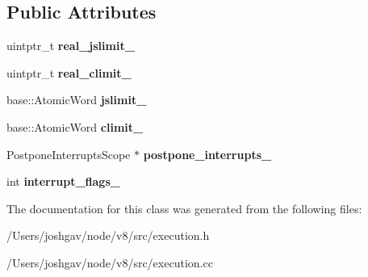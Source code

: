 \subsection*{Public Attributes}
\begin{DoxyCompactItemize}
\item 
uintptr\+\_\+t {\bfseries real\+\_\+jslimit\+\_\+}\hypertarget{classv8_1_1internal_1_1_stack_guard_1_1_thread_local_a06f2ec0bd13a31132859f4d1749179be}{}\label{classv8_1_1internal_1_1_stack_guard_1_1_thread_local_a06f2ec0bd13a31132859f4d1749179be}

\item 
uintptr\+\_\+t {\bfseries real\+\_\+climit\+\_\+}\hypertarget{classv8_1_1internal_1_1_stack_guard_1_1_thread_local_aebe6953c66e34e2f35f601954d504b97}{}\label{classv8_1_1internal_1_1_stack_guard_1_1_thread_local_aebe6953c66e34e2f35f601954d504b97}

\item 
base\+::\+Atomic\+Word {\bfseries jslimit\+\_\+}\hypertarget{classv8_1_1internal_1_1_stack_guard_1_1_thread_local_ad2eaff47c790e51551753aaaa73dd58d}{}\label{classv8_1_1internal_1_1_stack_guard_1_1_thread_local_ad2eaff47c790e51551753aaaa73dd58d}

\item 
base\+::\+Atomic\+Word {\bfseries climit\+\_\+}\hypertarget{classv8_1_1internal_1_1_stack_guard_1_1_thread_local_a3650cf32a9188751a7cd42c23de101d2}{}\label{classv8_1_1internal_1_1_stack_guard_1_1_thread_local_a3650cf32a9188751a7cd42c23de101d2}

\item 
Postpone\+Interrupts\+Scope $\ast$ {\bfseries postpone\+\_\+interrupts\+\_\+}\hypertarget{classv8_1_1internal_1_1_stack_guard_1_1_thread_local_a0c556d1816f10a572365c9e7181070d2}{}\label{classv8_1_1internal_1_1_stack_guard_1_1_thread_local_a0c556d1816f10a572365c9e7181070d2}

\item 
int {\bfseries interrupt\+\_\+flags\+\_\+}\hypertarget{classv8_1_1internal_1_1_stack_guard_1_1_thread_local_a8f95f4e987c16bd89a19e27a9fef0a47}{}\label{classv8_1_1internal_1_1_stack_guard_1_1_thread_local_a8f95f4e987c16bd89a19e27a9fef0a47}

\end{DoxyCompactItemize}


The documentation for this class was generated from the following files\+:\begin{DoxyCompactItemize}
\item 
/\+Users/joshgav/node/v8/src/execution.\+h\item 
/\+Users/joshgav/node/v8/src/execution.\+cc\end{DoxyCompactItemize}
